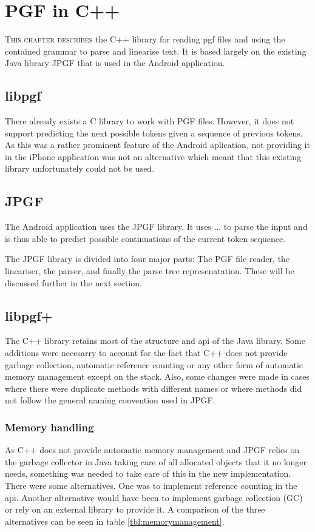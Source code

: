 \chapter{PGF in C++}
\lettrine[lines=4, loversize=-0.1, lraise=0.1]{T}{his chapter describes} the C++ library for reading pgf files and using the contained grammar to parse and linearise text. It is based largely on the existing Java library JPGF that is used in the Android application.


\section{libpgf}
There already exists a C library to work with PGF files. However, it does not support predicting the next possible tokens given a sequence of previous tokens. As this was a rather prominent feature of the Android aplication, not providing it in the iPhone application was not an alternative which meant that this existing library unfortunately could not be used.


\section{JPGF}
The Android application uses the JPGF library. It uses ... to parse the input and is thus able to predict possible continuations of the current token sequence.

The JPGF library is divided into four major parts: The PGF file reader, the lineariser, the parser, and finally the parse tree represenatation. These will be discussed further in the next section.


\section{libpgf+}
The C++ library retains most of the structure and api of the Java library. Some additions were necesarry to account for the fact that C++ does not provide garbage collection, automatic reference counting or any other form of automatic memory management except on the stack. Also, some changes were made in cases where there were duplicate methods with different names or where methods did not follow the general naming convention used in JPGF.


\subsection{Memory handling}
As C++ does not provide automatic memory management and JPGF relies on the garbage collector in Java taking care of all allocated objects that it no longer needs, something was needed to take care of this in the new implementation. There were some alternatives. One was to implement reference counting in the api. Another alternative would have been to implement garbage collection (GC) or rely on an external library to provide it. A comparison of the three alternatives can be seen in table \ref{tbl:memorymanagement}.

